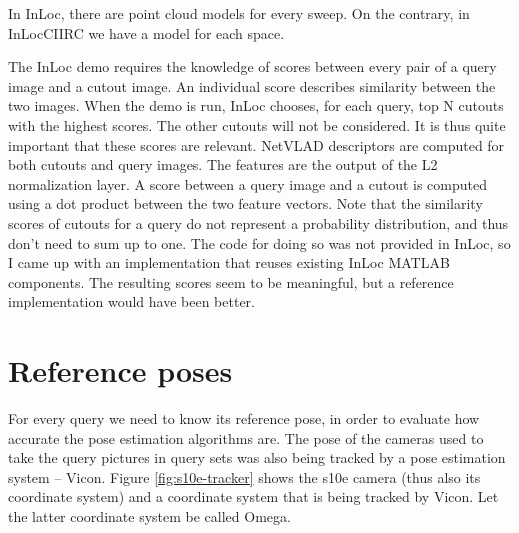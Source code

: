 \documentclass[twoside]{ctuthesis}
\theoremstyle{plain}
\theoremstyle{definition}
\theoremstyle{note}
\begin{document}
In InLoc, there are point cloud models for every sweep. On the contrary, in InLocCIIRC we have a model for each space.

The InLoc demo requires the knowledge of scores between every pair of a query image and a cutout image. An individual score describes similarity between the two images. When the demo is run, InLoc chooses, for each query, top N cutouts with the highest scores. The other cutouts will not be considered. It is thus quite important that these scores are relevant. NetVLAD \cite{Arandjelovic16} descriptors are computed for both cutouts and query images. The features are the output of the L2 normalization layer. A score between a query image and a cutout is computed using a dot product between the two feature vectors. Note that the similarity scores of cutouts for a query do not represent a probability distribution, and thus don't need to sum up to one. The code for doing so was not provided in InLoc, so I came up with an implementation that reuses existing InLoc MATLAB components. The resulting scores seem to be meaningful, but a reference implementation would have been better.

\section{Reference poses}
For every query we need to know its reference pose, in order to evaluate how accurate the pose estimation algorithms are. The pose of the cameras used to take the query pictures in query sets was also being tracked by a pose estimation system -- Vicon. Figure \ref{fig:s10e-tracker} shows the s10e camera (thus also its coordinate system) and a coordinate system that is being tracked by Vicon. Let the latter coordinate system be called Omega. 
\end{document}
